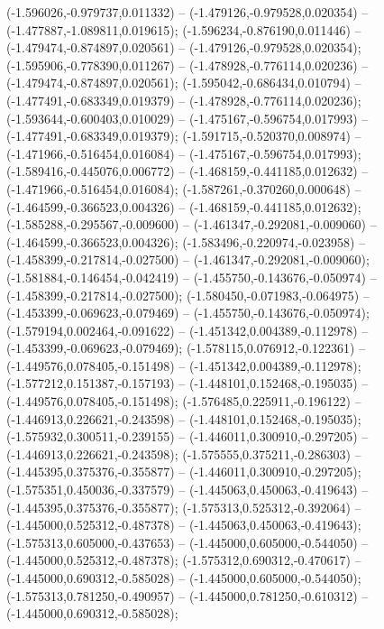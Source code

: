  (-1.596026,-0.979737,0.011332) -- (-1.479126,-0.979528,0.020354) -- (-1.477887,-1.089811,0.019615);
 (-1.596234,-0.876190,0.011446) -- (-1.479474,-0.874897,0.020561) -- (-1.479126,-0.979528,0.020354);
 (-1.595906,-0.778390,0.011267) -- (-1.478928,-0.776114,0.020236) -- (-1.479474,-0.874897,0.020561);
 (-1.595042,-0.686434,0.010794) -- (-1.477491,-0.683349,0.019379) -- (-1.478928,-0.776114,0.020236);
 (-1.593644,-0.600403,0.010029) -- (-1.475167,-0.596754,0.017993) -- (-1.477491,-0.683349,0.019379);
 (-1.591715,-0.520370,0.008974) -- (-1.471966,-0.516454,0.016084) -- (-1.475167,-0.596754,0.017993);
 (-1.589416,-0.445076,0.006772) -- (-1.468159,-0.441185,0.012632) -- (-1.471966,-0.516454,0.016084);
 (-1.587261,-0.370260,0.000648) -- (-1.464599,-0.366523,0.004326) -- (-1.468159,-0.441185,0.012632);
 (-1.585288,-0.295567,-0.009600) -- (-1.461347,-0.292081,-0.009060) -- (-1.464599,-0.366523,0.004326);
 (-1.583496,-0.220974,-0.023958) -- (-1.458399,-0.217814,-0.027500) -- (-1.461347,-0.292081,-0.009060);
 (-1.581884,-0.146454,-0.042419) -- (-1.455750,-0.143676,-0.050974) -- (-1.458399,-0.217814,-0.027500);
 (-1.580450,-0.071983,-0.064975) -- (-1.453399,-0.069623,-0.079469) -- (-1.455750,-0.143676,-0.050974);
 (-1.579194,0.002464,-0.091622) -- (-1.451342,0.004389,-0.112978) -- (-1.453399,-0.069623,-0.079469);
 (-1.578115,0.076912,-0.122361) -- (-1.449576,0.078405,-0.151498) -- (-1.451342,0.004389,-0.112978);
 (-1.577212,0.151387,-0.157193) -- (-1.448101,0.152468,-0.195035) -- (-1.449576,0.078405,-0.151498);
 (-1.576485,0.225911,-0.196122) -- (-1.446913,0.226621,-0.243598) -- (-1.448101,0.152468,-0.195035);
 (-1.575932,0.300511,-0.239155) -- (-1.446011,0.300910,-0.297205) -- (-1.446913,0.226621,-0.243598);
 (-1.575555,0.375211,-0.286303) -- (-1.445395,0.375376,-0.355877) -- (-1.446011,0.300910,-0.297205);
 (-1.575351,0.450036,-0.337579) -- (-1.445063,0.450063,-0.419643) -- (-1.445395,0.375376,-0.355877);
 (-1.575313,0.525312,-0.392064) -- (-1.445000,0.525312,-0.487378) -- (-1.445063,0.450063,-0.419643);
 (-1.575313,0.605000,-0.437653) -- (-1.445000,0.605000,-0.544050) -- (-1.445000,0.525312,-0.487378);
 (-1.575312,0.690312,-0.470617) -- (-1.445000,0.690312,-0.585028) -- (-1.445000,0.605000,-0.544050);
 (-1.575313,0.781250,-0.490957) -- (-1.445000,0.781250,-0.610312) -- (-1.445000,0.690312,-0.585028);
